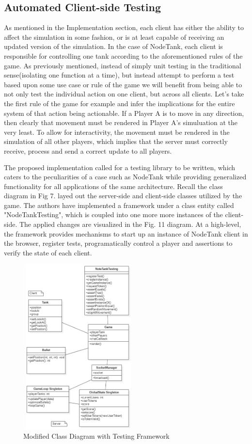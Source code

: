 \documentclass[conference]{IEEEtran}
\begin{document}
\subsection{Automated Client-side Testing}

As mentioned in the Implementation section, each client has either the ability to affect the simulation in some fashion, or is at least capable of receiving an updated
version of the simulation. In the case of NodeTank, each client is responsible for controlling one tank according to the aforementioned rules of the game. As previously mentioned,
instead of simply unit testing in the traditional sense(isolating one function at a time), but instead attempt to perform a test based upon some use case or rule of the game we will
 benefit from being able to not only test the individual action on one client, but across all clients. Let's take the first rule of the game for example and infer the implications for the entire system 
 of that action being actionable. If a Player A is to move in any direction, then clearly that movement must be rendered in Player A's simuluation at the very least. To allow for interactivity, 
 the movement must be rendered in the simulation of all other players, which implies that the server must correctly receive, process and send a correct update to all players. 
 
 The proposed implementation called for a testing library to be written, which caters to the peculiarities of a case such as NodeTank while providing generalized functionality for all 
 applications of the same architecture. Recall the class diagram in Fig 7. layed out the server-side and client-side classes utilized by the game. The authors have implemented a framework
 under a class entity called "NodeTankTesting", which is coupled into one more more instances of the client-side. The applied changes are visualized in the Fig. 11 diagram. At a high-level,
 the framework provides mechanisms to start up an instance of NodeTank client in the browser, register tests, programatically control a player and assertions to verify the state of each client. 

\begin{figure}[htbp]
\centerline{\includegraphics [width = 6cm, height = 9cm] {classv2.PNG}}
\caption{Modified Class Diagram with Testing Framework}
\end{figure}
\end{document}
